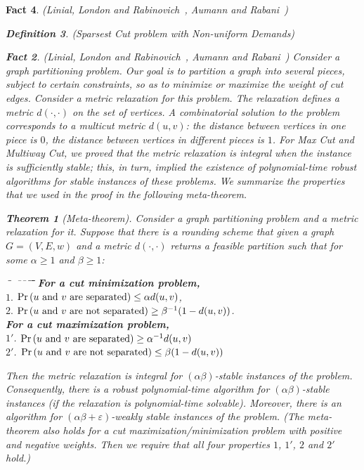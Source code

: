 \documentclass[twoside,leqno,twocolumn]{article}
\newcommand {\brc}   [1] {\left(#1\right)}
\newcommand {\Prob}  [1] {\Pr \brc{#1 }}
\newtheorem{theorem}{Theorem}[section]
\newtheorem{Definition}[theorem]{Definition}
\newtheorem{fact}[theorem]{Fact}
\begin{document}
\begin{fact}{\sc (Linial, London and Rabinovich~\cite{LLR}, Aumann and Rabani~\cite{AR})}
\begin{Definition} {\sc (Sparsest Cut problem with Non-uniform Demands)}
\begin{fact}{\sc (Linial, London and Rabinovich~\cite{LLR}, Aumann and Rabani~\cite{AR})}
Consider a graph partitioning problem. Our goal is to partition a graph into several pieces, subject to certain constraints,
so as to minimize or maximize the weight of cut edges. Consider a metric relaxation for this problem. The relaxation
defines a metric $d(\cdot, \cdot)$ on the set of vertices. A combinatorial solution to the problem corresponds to a 
multicut metric $d(u,v)$: the distance between vertices in one piece is $0$, the distance between vertices in different
pieces is $1$. For Max Cut and Multiway Cut, 
we proved that \textit{the metric relaxation is integral when the instance is sufficiently stable};
this, in turn, implied the existence of polynomial-time robust algorithms for stable instances of these problems.
We summarize the properties that we used in the proof in the following meta-theorem.
\begin{theorem}[Meta-theorem]
Consider a graph partitioning problem and a metric relaxation for it. Suppose that there is a rounding scheme 
that given a graph $G=(V,E,w)$ and a metric $d(\cdot, \cdot)$ returns a feasible partition such that
for some $\alpha \geq 1$ and $\beta \geq 1$:
\begin{tabbing}
\ifSODA
\=\  \=\quad \ \=\ \=\ \=\ \=\kill
\else
\quad\=\quad\=\quad\quad\=\quad\=\quad\=\quad\=\kill
\fi
\>\textnormal{\textbf{For a cut minimization problem,}} \\
\>\>$1.$ \> $\Prob{u\textnormal{ and }v\textnormal{ are separated}} \leq \alpha d(u,v)$, \\
\>\>$2.$ \> $\Prob{u\textnormal{ and }v\textnormal{ are not separated}} \geq \beta^{-1}(1-d(u,v))$.\\[0.3em]
\>\textnormal{\textbf{For a cut maximization problem,}} \\
\>\>$1'$.  \> $\Prob{u\textnormal{ and }v\textnormal{ are separated}} \geq \alpha^{-1} d(u,v)$  \\
\>\>$2'$.  \> $\Prob{u\textnormal{ and }v\textnormal{ are not separated}} \leq \beta (1-d(u,v))$
\end{tabbing}
Then the metric relaxation is integral for $(\alpha\beta)$-stable instances of the problem.
Consequently, there is a robust polynomial-time algorithm for $(\alpha\beta)$-stable instances
(if the relaxation is polynomial-time solvable). Moreover, there is an algorithm
for $(\alpha\beta + \varepsilon)$-weakly stable instances of the problem.
(The meta-theorem also holds for a cut maximization/minimization problem with positive and negative weights.
Then we require that all four properties $1$, $1'$, $2$ and $2'$ hold.)

\end{theorem}
\end{fact}
\end{Definition}
\end{fact}
\end{document}
